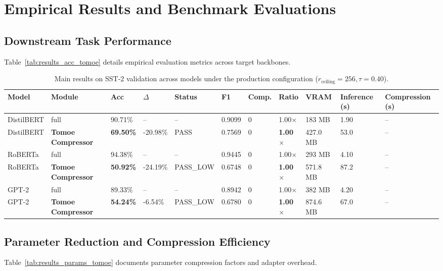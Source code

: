 \section{Empirical Results and Benchmark Evaluations}

\subsection{Downstream Task Performance}
Table~\ref{tab:results_acc_tomoe} details empirical evaluation metrics across target backbones.

\begin{table}[t]
\centering
\small
\begin{tabular}{lllllllllll}
\toprule
\textbf{Model} & \textbf{Module} & \textbf{Acc} & \textbf{$\Delta$} & \textbf{Status} & \textbf{F1} & \textbf{Comp.} & \textbf{Ratio} & \textbf{VRAM} & \textbf{Inference (s)} & \textbf{Compression (s)} \\
\midrule
DistilBERT & full & 90.71\% & -- & -- & 0.9099 & 0 & 1.00$\times$ & 183 MB & 1.90 & -- \\
DistilBERT & \textbf{Tomoe Compressor} & \textbf{69.50\%} & -20.98\% & PASS & 0.7569 & 0 & \textbf{1.00$\times$} & 427.0 MB & 53.0 & -- \\
RoBERTa & full & 94.38\% & -- & -- & 0.9445 & 0 & 1.00$\times$ & 293 MB & 4.10 & -- \\
RoBERTa & \textbf{Tomoe Compressor} & \textbf{50.92\%} & -24.19\% & PASS_LOW & 0.6748 & 0 & \textbf{1.00$\times$} & 571.8 MB & 87.2 & -- \\
GPT-2 & full & 89.33\% & -- & -- & 0.8942 & 0 & 1.00$\times$ & 382 MB & 4.20 & -- \\
GPT-2 & \textbf{Tomoe Compressor} & \textbf{54.24\%} & -6.54\% & PASS_LOW & 0.6780 & 0 & \textbf{1.00$\times$} & 874.6 MB & 67.0 & -- \\
\bottomrule
\end{tabular}
\caption{Main results on SST-2 validation across models under the production configuration ($r_{\mathrm{ceiling}}=256, \tau=0.40$).}
\label{tab:main_sst2}
\end{table}

\subsection{Parameter Reduction and Compression Efficiency}
Table~\ref{tab:results_params_tomoe} documents parameter compression factors and adapter overhead.

